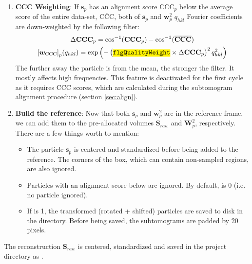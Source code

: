 \begin{enumerate}
    \item \textbf{CCC Weighting}: If $\bm{s}_{p}$ has an alignment score $\bm{\mathrm{CCC}}_{p}$ below the average score of the entire data-set, $\overline{\bm{\mathrm{CCC}}}$, both of $\bm{s}_{p}$ and $\bm{w}_{p}^2$ $q_{hkl}$ Fourier coefficients are down-weighted by the following filter:
    \begin{gather}
        \Delta \bm{\mathrm{CCC}}_{p} = \cos^{-1}(\bm{\mathrm{CCC}}_{p}) - \cos^{-1}(\overline{\bm{\mathrm{CCC}}})\notag\\
        {[\bm{w}_{\mathrm{CCC}}]}_p(q_{hkl}) = \exp \left({ -\left(\code{flgQualityWeight} \times \Delta \bm{\mathrm{CCC}}_{p}\right)^2 q_{hkl}^2 }\right)
    \end{gather}
    The further away the particle is from the mean, the stronger the filter. It mostly affects high frequencies. This feature is deactivated for the first cycle as it requires CCC scores, which are calculated during the subtomogram alignment procedure (section \ref{sec:align}).

    \item \textbf{Build the reference}: Now that both $\bm{s}_{p}$ and $\bm{w}_{p}^2$ are in the reference frame, we can add them to the pre-allocated volumes $\bm{S}_{raw}$ and $\bm{W}_{p}^2$, respectively. There are a few things worth to mention:
    \begin{itemize}

        \item The particle $\bm{s}_{p}$ is centered and standardized before being added to the reference. The corners of the box, which can contain non-sampled regions, are also ignored.

        \item Particles with an alignment score below  are ignored. By default,  is 0 (i.e. no particle ignored).

        \item If  is 1, the transformed (rotated + shifted) particles are saved to disk in the  directory. Before being saved, the subtomograms are padded by 20 pixels.
    \end{itemize}
\end{enumerate}

The reconstruction $\bm{S}_{raw}$ is centered, standardized and saved in the project directory as .

